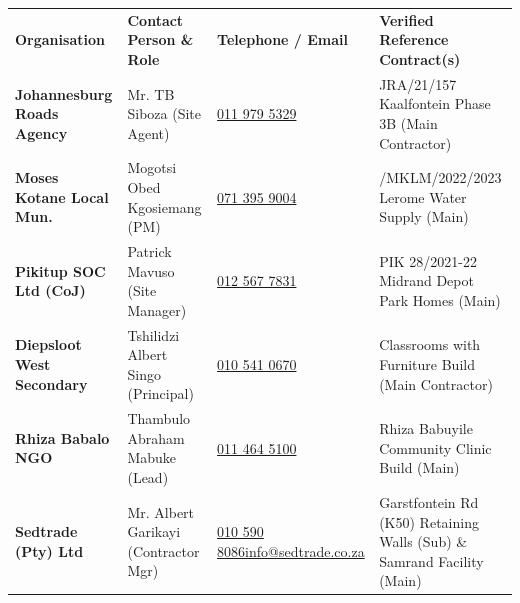 \documentclass[a4paper,11pt]{article}
\begin{document}
\renewcommand{\arraystretch}{1.27}
\noindent
\begin{tabularx}{\textwidth}{@{}
    >{\raggedright\arraybackslash}p{3.4cm}
    >{\raggedright\arraybackslash}p{3.2cm}
    >{\raggedright\arraybackslash}p{4.0cm}
    >{\raggedright\arraybackslash}X
@{}}
\rowcolor{mhnavy}
{\color{white}\bfseries\fontsize{7.9pt}{9.6pt}\selectfont Organisation} &
{\color{white}\bfseries\fontsize{7.9pt}{9.6pt}\selectfont Contact Person \& Role} &
{\color{white}\bfseries\fontsize{7.9pt}{9.6pt}\selectfont Telephone / Email} &
{\color{white}\bfseries\fontsize{7.9pt}{9.6pt}\selectfont Verified Reference Contract(s)} \\
\rowcolor{mhbluelight}
\fontsize{7.5pt}{9.3pt}\selectfont\bfseries Johannesburg Roads Agency & \fontsize{7.5pt}{9.3pt}\selectfont Mr. TB Siboza (Site Agent) & \fontsize{7.5pt}{9.3pt}\selectfont \href{tel:0119795329}{011 979 5329} & \fontsize{7.5pt}{9.3pt}\selectfont JRA/21/157 Kaalfontein Phase 3B (Main Contractor) \\
\fontsize{7.5pt}{9.3pt}\selectfont\bfseries Moses Kotane Local Mun. & \fontsize{7.5pt}{9.3pt}\selectfont Mogotsi Obed Kgosiemang (PM) & \fontsize{7.5pt}{9.3pt}\selectfont \href{tel:0713959004}{071 395 9004} & \fontsize{7.5pt}{9.3pt}\selectfont 014/MKLM/2022/2023 Lerome Water Supply (Main) \\
\rowcolor{mhbluelight}
\fontsize{7.5pt}{9.3pt}\selectfont\bfseries Pikitup SOC Ltd (CoJ) & \fontsize{7.5pt}{9.3pt}\selectfont Patrick Mavuso (Site Manager) & \fontsize{7.5pt}{9.3pt}\selectfont \href{tel:0125677831}{012 567 7831} & \fontsize{7.5pt}{9.3pt}\selectfont PIK 28/2021-22 Midrand Depot Park Homes (Main) \\
\fontsize{7.5pt}{9.3pt}\selectfont\bfseries Diepsloot West Secondary & \fontsize{7.5pt}{9.3pt}\selectfont Tshilidzi Albert Singo (Principal) & \fontsize{7.5pt}{9.3pt}\selectfont \href{tel:0105410670}{010 541 0670} & \fontsize{7.5pt}{9.3pt}\selectfont 4 Classrooms with Furniture Build (Main Contractor) \\
\rowcolor{mhbluelight}
\fontsize{7.5pt}{9.3pt}\selectfont\bfseries Rhiza Babalo NGO & \fontsize{7.5pt}{9.3pt}\selectfont Thambulo Abraham Mabuke (Lead) & \fontsize{7.5pt}{9.3pt}\selectfont \href{tel:0114645100}{011 464 5100} & \fontsize{7.5pt}{9.3pt}\selectfont Rhiza Babuyile Community Clinic Build (Main) \\
\fontsize{7.5pt}{9.3pt}\selectfont\bfseries Sedtrade (Pty) Ltd & \fontsize{7.5pt}{9.3pt}\selectfont Mr. Albert Garikayi (Contractor Mgr) & \fontsize{7.5pt}{9.3pt}\selectfont \href{tel:0105908086}{010 590 8086}\newline\href{mailto:info@sedtrade.co.za}{info@sedtrade.co.za} & \fontsize{7.5pt}{9.3pt}\selectfont Garstfontein Rd (K50) Retaining Walls (Sub) \& Samrand Facility (Main) \\

\end{tabularx}
\end{document}

